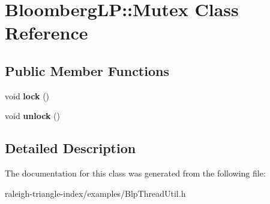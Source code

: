 \section{Bloomberg\+LP\+:\+:Mutex Class Reference}
\label{class_bloomberg_l_p_1_1_mutex}
\subsection*{Public Member Functions}
\begin{DoxyCompactItemize}
\item 
void {\bfseries lock} ()\label{class_bloomberg_l_p_1_1_mutex_a7c1417e9eac9f69e93c9ed44b6329c03}

\item 
void {\bfseries unlock} ()\label{class_bloomberg_l_p_1_1_mutex_a4db729dc654f8fc20158db191b5c8dd7}

\end{DoxyCompactItemize}


\subsection{Detailed Description}


The documentation for this class was generated from the following file\+:\begin{DoxyCompactItemize}
\item 
raleigh-\/triangle-\/index/examples/Blp\+Thread\+Util.\+h\end{DoxyCompactItemize}
